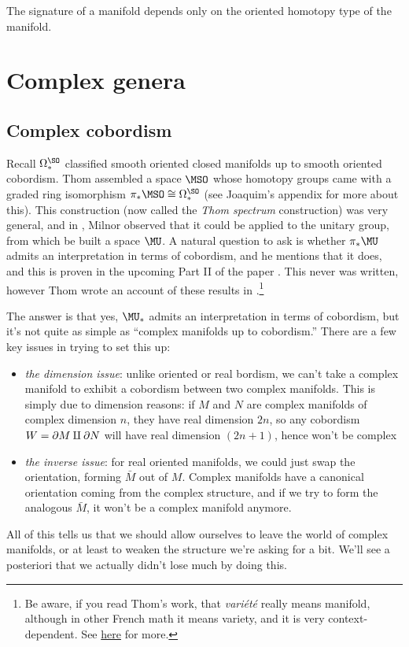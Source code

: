 \documentclass[11pt]{book}
\begin{document}
\begin{corollary} The signature of a manifold depends only on the oriented homotopy type of the manifold.
\end{corollary}


\section{Complex genera}

\subsection{Complex cobordism}


Recall $\Omega^\SO_\ast$ classified smooth oriented closed manifolds up to smooth oriented cobordism. Thom assembled a space $\MSO$ whose homotopy groups came with a graded ring isomorphism $\pi_\ast\MSO \cong \Omega^\SO_\ast$ \cite{thomQuelquesProprietesGlobales1954} (see Joaquim's appendix for more about this). This construction (now called the \emph{Thom spectrum} construction) was very general, and in \cite{milnorCobordismRingOmega1960}, Milnor observed that it could be applied to the unitary group, from which be built a space $\MU$. A natural question to ask is whether $\pi_\ast \MU$ admits an interpretation in terms of cobordism, and he mentions that it does, and this is proven in the upcoming Part II of the paper \cite{milnorCobordismRingOmega1960}. This never was written, however Thom wrote an account of these results in \cite[\S5]{thomTravauxMilnorCobordisme1958}.\footnote{Be aware, if you read Thom's work, that \emph{vari\'et\'e} really means manifold, although in other French math it means variety, and it is very context-dependent. See \href{https://reyssat.users.lmno.cnrs.fr/dico/dicofa.html}{here} for more.}

The answer is that yes, $\MU_\ast$ admits an interpretation in terms of cobordism, but it's not quite as simple as ``complex manifolds up to cobordism.'' There are a few key issues in trying to set this up:
\begin{itemize}
    \item \emph{the dimension issue}: unlike oriented or real bordism, we can't take a complex manifold to exhibit a cobordism between two complex manifolds. This is simply due to dimension reasons: if $M$ and $N$ are complex manifolds of complex dimension $n$, they have real dimension $2n$, so any cobordism $W = \partial M \amalg \partial N$ will have real dimension $(2n+1)$, hence won't be complex
    \item \emph{the inverse issue}: for real oriented manifolds, we could just swap the orientation, forming $\bar{M}$ out of $M$. Complex manifolds have a canonical orientation coming from the complex structure, and if we try to form the analogous $\bar{M}$, it won't be a complex manifold anymore.
\end{itemize}
All of this tells us that we should allow ourselves to leave the world of complex manifolds, or at least to weaken the structure we're asking for a bit. We'll see a posteriori that we actually didn't lose much by doing this.
\end{document}
